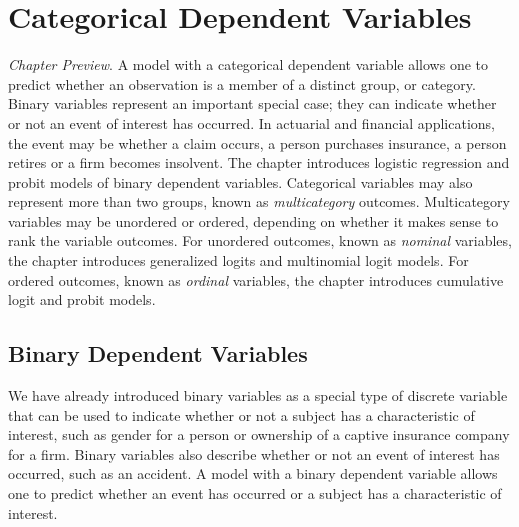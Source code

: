 \setcounter{chapter}{10}
\chapter{Categorical Dependent Variables}
{\small \textit{Chapter Preview}. A model with a categorical
dependent variable allows one to predict whether an observation is a
member of a distinct group, or category. Binary variables represent
an important special case; they can indicate whether or not an event
of interest has occurred. In actuarial and financial applications,
the event may be whether a claim occurs, a person purchases
insurance, a person retires or a firm becomes insolvent. The chapter
introduces logistic regression and probit models of binary dependent
variables. Categorical variables may also represent more than two
groups, known as \emph{multicategory} outcomes. Multicategory
variables may be unordered or ordered, depending on whether it makes
sense to rank the variable outcomes. For unordered outcomes, known
as \emph{nominal} variables, the chapter introduces generalized
logits and multinomial logit models. For ordered outcomes, known as
\emph{ordinal} variables, the chapter introduces cumulative logit
and probit models.}

\section{Binary Dependent Variables}

We have already introduced binary variables as a special type of
discrete variable that can be used to indicate whether or not a
subject has a characteristic of interest, such as gender for a
person or ownership of a captive insurance company for a firm.
Binary variables also describe whether or not an event of interest
has occurred, such as an accident. A model with a binary dependent
variable allows one to predict whether an event has occurred or a
subject has a characteristic of interest.

\linejed

